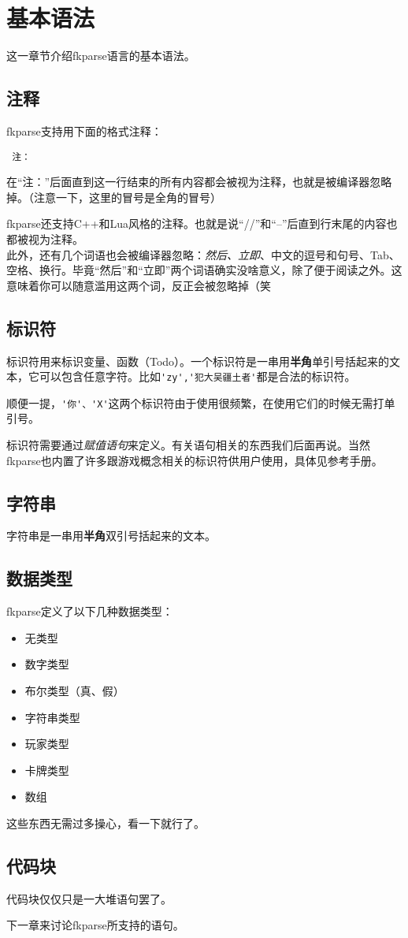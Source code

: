 \chapter{基本语法}

这一章节介绍fkparse语言的基本语法。

\section{注释}

fkparse支持用下面的格式注释：

\begin{verbatim}
 注：
\end{verbatim}

在“注：”后面直到这一行结束的所有内容都会被视为注释，也就是被编译器忽略掉。（注意一下，这里的冒号是全角的冒号）

fkparse还支持C++和Lua风格的注释。也就是说“//”和“--”后直到行末尾的内容也都被视为注释。\\

此外，还有几个词语也会被编译器忽略：\emph{然后、立即}、中文的逗号和句号、Tab、空格、换行。毕竟“然后”和“立即”两个词语确实没啥意义，除了便于阅读之外。这意味着你可以随意滥用这两个词，反正会被忽略掉（笑

\section{标识符}

标识符用来标识变量、函数（Todo）。一个标识符是一串用\textbf{半角}单引号括起来的文本，它可以包含任意字符。比如\verb|'zy','犯大吴疆土者'|都是合法的标识符。

顺便一提，\verb|'你'、'X'|这两个标识符由于使用很频繁，在使用它们的时候无需打单引号。

标识符需要通过\textit{赋值语句}来定义。有关语句相关的东西我们后面再说。当然fkparse也内置了许多跟游戏概念相关的标识符供用户使用，具体见参考手册。

\section{字符串}

字符串是一串用\textbf{半角}双引号括起来的文本。

\section{数据类型}

fkparse定义了以下几种数据类型：

\begin{itemize}
 \item 无类型
 \item 数字类型
 \item 布尔类型（真、假）
 \item 字符串类型
 \item 玩家类型
 \item 卡牌类型
 \item 数组
\end{itemize}

这些东西无需过多操心，看一下就行了。

\section{代码块}

代码块仅仅只是一大堆语句罢了。

下一章来讨论fkparse所支持的语句。


